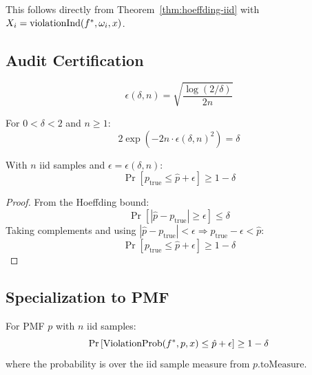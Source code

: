 This follows directly from Theorem~\ref{thm:hoeffding-iid} with $X_i = \text{violationInd}(f^{\ast}, \omega_i, x)$.

\subsection{Audit Certification}

\begin{definition}
\[
\epsilon(\delta, n) = \sqrt{\frac{\log(2/\delta)}{2n}}
\]
\end{definition}

\begin{lemma}
For $0 < \delta < 2$ and $n \ge 1$:
\[
2 \exp(-2n \cdot \epsilon(\delta, n)^2) = \delta
\]
\end{lemma}

\begin{theorem}\label{thm:audit-cert-measure}
With $n$ iid samples and $\epsilon = \epsilon(\delta, n)$:
\[
\Pr\left[p_{\text{true}} \le \hat{p} + \epsilon\right] \ge 1 - \delta
\]
\end{theorem}

\begin{proof}
From the Hoeffding bound:
\[
\Pr\left[|\hat{p} - p_{\text{true}}| \ge \epsilon\right] \le \delta
\]
Taking complements and using $|\hat{p} - p_{\text{true}}| < \epsilon \Rightarrow p_{\text{true}} - \epsilon < \hat{p}$:
\[
\Pr\left[p_{\text{true}} \le \hat{p} + \epsilon\right] \ge 1 - \delta
\]
\end{proof}

\subsection{Specialization to PMF}

\begin{corollary}
For PMF $p$ with $n$ iid samples:
\[
\Pr\left[\text{ViolationProb}(f^{\ast}, p, x) \le \hat{p} + \epsilon\right] \ge 1 - \delta
\]
where the probability is over the iid sample measure from $p.\text{toMeasure}$.
\end{corollary}
